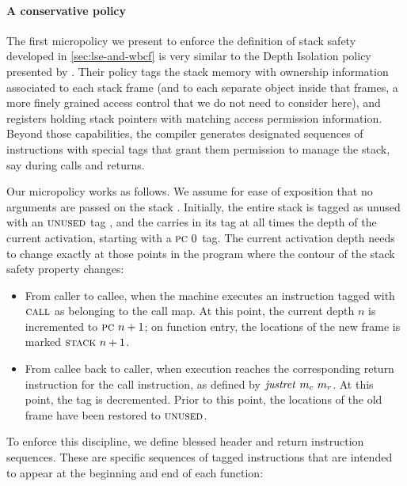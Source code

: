 \documentclass[acmsmall,review,anonymous]{acmart}\settopmatter{printfolios=true,printccs=false,printacmref=false}
\begin{document}
\paragraph*{A conservative policy}
%
The first micropolicy we present to enforce the definition of stack safety
developed in \cref{sec:lse-and-wbcf} is very similar to the Depth Isolation
policy presented by \citet{DBLP:conf/sp/RoesslerD18}. Their policy tags the
stack memory with ownership information associated to each stack frame (and to
each separate object inside that frames, a more finely grained access control
that we do not need to consider here), and registers holding stack pointers with
matching access permission information. Beyond those capabilities, the compiler
generates designated sequences of instructions with special tags that grant them
permission to manage the stack, say during calls and returns. 

Our micropolicy works as follows. We assume for ease of exposition that no
arguments are passed on the stack . Initially, the
entire stack is tagged as unused with an $\textsc{unused}$ tag , and the {\PCname}
carries in its tag at all times the depth of the current activation, starting
with a $\textsc{pc} ~ 0$ tag. The current activation depth needs to change
exactly at those points in the program where the contour of the stack safety
property changes:

\begin{itemize}

\item From caller to callee, when the machine executes an instruction tagged
  with $\textsc{call}$ as belonging to the call map. At this point, the current
  {\PCname} depth $n$ is incremented to $\textsc{pc} ~ n + 1$; on function entry,
  the locations of the new frame is marked $\textsc{stack} ~ n + 1$.

\item From callee back to caller, when execution reaches the corresponding
  return instruction for the call instruction, as defined by
  $\mathit{justret}\ m_c\ m_r$. At this point, the {\PCname} tag is decremented.
  Prior to this point, the locations of the old frame have been restored to
  $\textsc{unused}$.

\end{itemize}

To enforce this discipline, we define blessed header and return instruction
sequences. These are specific sequences of tagged instructions that are intended
to appear at the beginning and end of each function:
\end{document}
